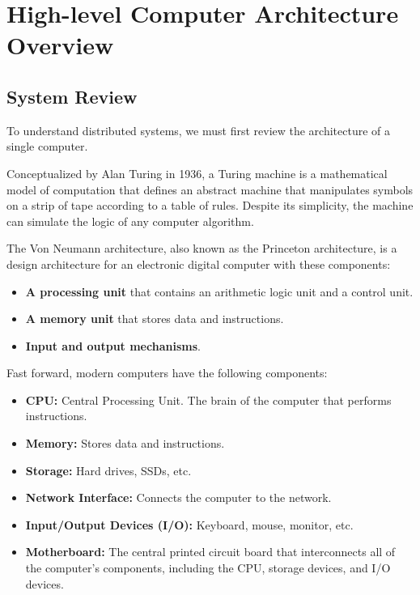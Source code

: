 \section{High-level Computer Architecture Overview}

\subsection{System Review}
To understand distributed systems, we must first review 
the architecture of a single computer.

\begin{Def}
    
    Conceptualized by Alan Turing in 1936, a Turing machine is a mathematical model of computation that defines an abstract machine 
    that manipulates symbols on a strip of tape according to a table of rules. Despite its simplicity, the machine can simulate the 
    logic of any computer algorithm.
\end{Def}

\begin{Def}
    
    The Von Neumann architecture, also known as the Princeton architecture, is a 
    design architecture for an electronic digital computer with these components:
    \begin{itemize}
        \item \textbf{A processing unit} that contains an arithmetic logic unit and a control unit.
        \item \textbf{A memory unit} that stores data and instructions.
        \item \textbf{Input and output mechanisms}.
    \end{itemize}
\end{Def}

\noindent
Fast forward, modern computers have the following components:
\begin{Def}

    \begin{itemize}
        \item \textbf{CPU:} Central Processing Unit. The brain of the computer that performs instructions.
        \item \textbf{Memory:} Stores data and instructions.
        \item \textbf{Storage:} Hard drives, SSDs, etc.
        \item \textbf{Network Interface:} Connects the computer to the network.
        \item \textbf{Input/Output Devices (I/O):} Keyboard, mouse, monitor, etc.
        \item \textbf{Motherboard:} The central printed circuit board that interconnects all of the computer's components, including the CPU, storage devices, and I/O devices.
    \end{itemize}
\end{Def}

